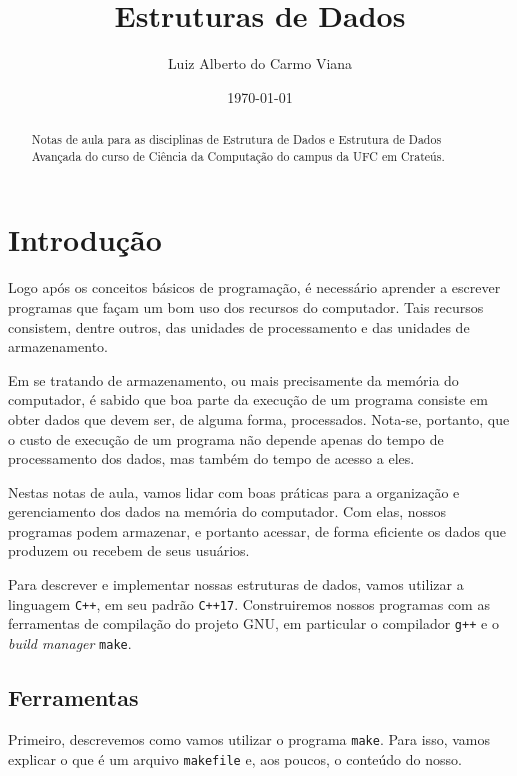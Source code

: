\documentclass[11pt]{article}
\author{Luiz Alberto do Carmo Viana}
\date{\today}
\title{Estruturas de Dados}
\begin{document}
\maketitle
\begin{abstract}
Notas de aula para as disciplinas de Estrutura de Dados e Estrutura de Dados Avançada do curso de Ciência da Computação do campus da UFC em Crateús.
\end{abstract}

\setcounter{tocdepth}{2}
\tableofcontents

\pagebreak

\section{Introdução}
\label{sec:org50d9085}

Logo após os conceitos básicos de programação, é necessário aprender
a escrever programas que façam um bom uso dos recursos do
computador.  Tais recursos consistem, dentre outros, das unidades de
processamento e das unidades de armazenamento.

Em se tratando de armazenamento, ou mais precisamente da memória do
computador, é sabido que boa parte da execução de um programa
consiste em obter dados que devem ser, de alguma forma, processados.
Nota-se, portanto, que o custo de execução de um programa não
depende apenas do tempo de processamento dos dados, mas também do
tempo de acesso a eles.

Nestas notas de aula, vamos lidar com boas práticas para a
organização e gerenciamento dos dados na memória do computador.  Com
elas, nossos programas podem armazenar, e portanto acessar, de forma
eficiente os dados que produzem ou recebem de seus usuários.

Para descrever e implementar nossas estruturas de dados, vamos
utilizar a linguagem \texttt{C++}, em seu padrão \texttt{C++17}.  Construiremos
nossos programas com as ferramentas de compilação do projeto GNU, em
particular o compilador \texttt{g++} e o \emph{build manager} \texttt{make}.

\subsection{Ferramentas}
\label{sec:org720ef4b}

Primeiro, descrevemos como vamos utilizar o programa \texttt{make}.
Para isso, vamos explicar o que é um arquivo \texttt{makefile} e,
aos poucos, o conteúdo do nosso.
\end{document}

